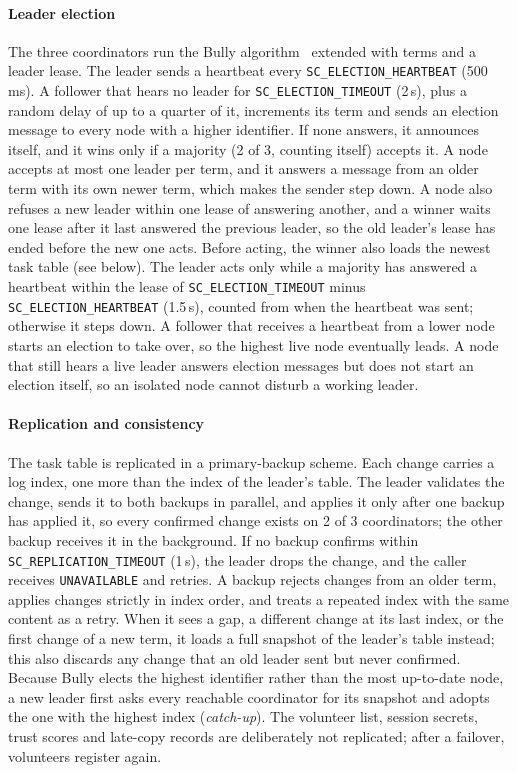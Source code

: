 \paragraph{Leader election} The three coordinators run the Bully algorithm~\cite{garciamolina1982elections} extended with terms and a leader lease. The leader sends a heartbeat every \texttt{SC\_ELECTION\_HEARTBEAT} (500\,ms). A follower that hears no leader for \texttt{SC\_ELECTION\_TIMEOUT} (2\,s), plus a random delay of up to a quarter of it, increments its term and sends an election message to every node with a higher identifier. If none answers, it announces itself, and it wins only if a majority (2 of 3, counting itself) accepts it. A node accepts at most one leader per term, and it answers a message from an older term with its own newer term, which makes the sender step down. A node also refuses a new leader within one lease of answering another, and a winner waits one lease after it last answered the previous leader, so the old leader's lease has ended before the new one acts. Before acting, the winner also loads the newest task table (see below). The leader acts only while a majority has answered a heartbeat within the lease of \texttt{SC\_ELECTION\_TIMEOUT} minus \texttt{SC\_ELECTION\_HEARTBEAT} (1.5\,s), counted from when the heartbeat was sent; otherwise it steps down. A follower that receives a heartbeat from a lower node starts an election to take over, so the highest live node eventually leads. A node that still hears a live leader answers election messages but does not start an election itself, so an isolated node cannot disturb a working leader.

\paragraph{Replication and consistency} The task table is replicated in a primary-backup scheme. Each change carries a log index, one more than the index of the leader's table. The leader validates the change, sends it to both backups in parallel, and applies it only after one backup has applied it, so every confirmed change exists on 2 of 3 coordinators; the other backup receives it in the background. If no backup confirms within \texttt{SC\_REPLICATION\_TIMEOUT} (1\,s), the leader drops the change, and the caller receives \texttt{UNAVAILABLE} and retries. A backup rejects changes from an older term, applies changes strictly in index order, and treats a repeated index with the same content as a retry. When it sees a gap, a different change at its last index, or the first change of a new term, it loads a full snapshot of the leader's table instead; this also discards any change that an old leader sent but never confirmed. Because Bully elects the highest identifier rather than the most up-to-date node, a new leader first asks every reachable coordinator for its snapshot and adopts the one with the highest index (\emph{catch-up}). The volunteer list, session secrets, trust scores and late-copy records are deliberately not replicated; after a failover, volunteers register again.

